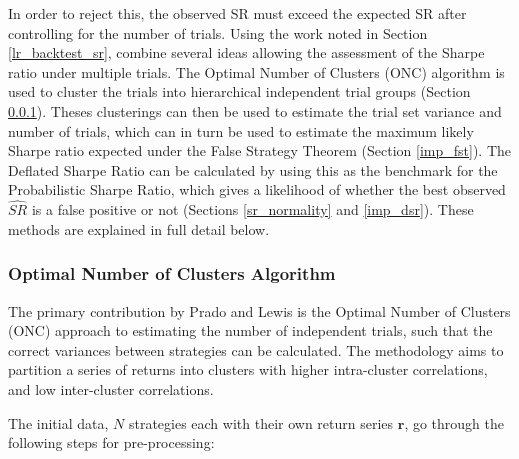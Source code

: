 \documentclass[a4paper,11pt,oneside]{article}
\theoremstyle{plain}
\theoremstyle{definition}
\begin{document}
	In order to reject this, the observed SR must exceed the expected SR after controlling for the number of trials. Using the 
	work noted in Section \ref{lr_backtest_sr}, \citet{PradoDSR} combine several ideas allowing the assessment of the Sharpe ratio under multiple trials. The Optimal Number of Clusters (ONC) algorithm is used to cluster the trials into hierarchical independent trial groups (Section \ref{imp_onc}). Theses clusterings can then be used to estimate the trial set variance and number of trials, which can in turn be used to estimate the maximum likely Sharpe ratio expected under the False Strategy Theorem (Section  \ref{imp_fst}). The Deflated Sharpe Ratio can be calculated by using this as the benchmark for the Probabilistic Sharpe Ratio, which gives a likelihood of whether the best observed $\widehat{SR}$ is a false positive or not (Sections \ref{sr_normality} and \ref{imp_dsr}). These methods are explained in full detail below.
	
	\subsubsection{Optimal Number of Clusters Algorithm}\label{imp_onc}
	
	The primary contribution by Prado and Lewis is the Optimal Number of Clusters (ONC) approach to estimating the number of independent trials, such that the correct variances between strategies can be calculated. The methodology aims to partition a series of returns into clusters with higher intra-cluster correlations, and low inter-cluster correlations. \newline
	
	The initial data, $N$ strategies each with their own return series $\mathbf{r}$, go through the following steps for pre-processing:
		
\end{document}
